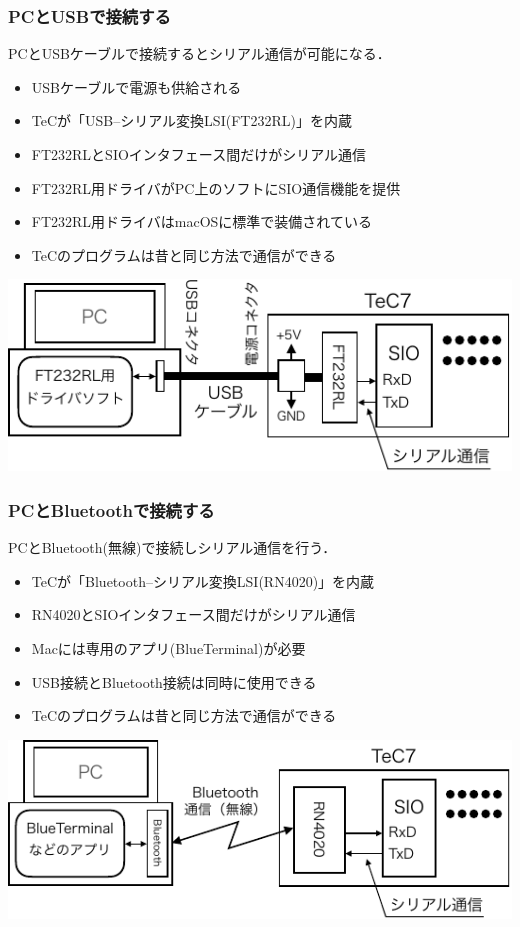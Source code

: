 \documentclass[handout]{beamer}        %
\begin{document}
\begin{frame}
  \frametitle{PCとUSBで接続する}
  PCとUSBケーブルで接続するとシリアル通信が可能になる．
  \begin{itemize}
    \item USBケーブルで電源も供給される
    \item TeCが「USB--シリアル変換LSI(FT232RL)」を内蔵
    \item FT232RLとSIOインタフェース間だけがシリアル通信
    \item FT232RL用ドライバがPC上のソフトにSIO通信機能を提供
    \item FT232RL用ドライバはmacOSに標準で装備されている
    \item TeCのプログラムは昔と同じ方法で通信ができる
  \end{itemize}
  \centerline{\includegraphics[scale=1.0]{../Keynote/serial6-crop.pdf}}
\end{frame}

\begin{frame}
  \frametitle{PCとBluetoothで接続する}
  PCとBluetooth(無線)で接続しシリアル通信を行う．
  \begin{itemize}
    \item TeCが「Bluetooth--シリアル変換LSI(RN4020)」を内蔵
    \item RN4020とSIOインタフェース間だけがシリアル通信
    \item Macには専用のアプリ(BlueTerminal)が必要
    \item USB接続とBluetooth接続は同時に使用できる
    \item TeCのプログラムは昔と同じ方法で通信ができる
  \end{itemize}
  \centerline{\includegraphics[scale=1.0]{../Keynote/serial7-crop.pdf}}
\end{frame}
\end{document}
